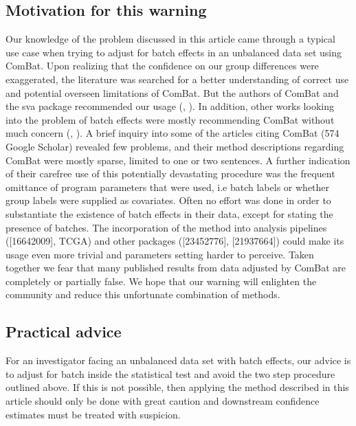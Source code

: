 \documentclass{bio}
\newcommand\CITE[1]{\textcolor{CITEcol}{[#1]}}
\begin{document}
\subsection{Motivation for this warning}

Our knowledge of the problem discussed in this article came through a typical use case when trying to adjust for batch effects in an unbalanced data set using ComBat. Upon realizing that the confidence on our group differences were exaggerated, the literature was searched for a better understanding of correct use and potential overseen limitations of ComBat. But the authors of ComBat and the sva package recommended our usage (\citealp{Johnson2007}, \citealp{Leek2012}). In addition, other works looking into the problem of batch effects were mostly recommending ComBat without much concern (\citealp{Kupfer2012}, \citealp{Kitchen2011}). A brief inquiry into  some of the articles citing ComBat (574 Google Scholar) revealed few problems, and their method descriptions regarding ComBat were mostly sparse, limited to one or two sentences. A further indication of their carefree use of this potentially devastating procedure was the frequent omittance of program parameters that were used, i.e batch labels or whether group labels were supplied as covariates. Often no effort was done in order to substantiate the existence of batch effects in their data, except for stating the presence of batches. The incorporation of the method into analysis pipelines (\CITE{16642009}, TCGA) and other packages (\CITE{23452776}, \CITE{21937664}) could make its usage even more trivial and parameters setting harder to perceive. Taken together we fear that many published results from data adjusted by ComBat are completely or partially false. We hope that our warning will enlighten the community and  reduce this unfortunate combination of methods.


\subsection{Practical advice}

For an investigator facing an unbalanced data set with batch effects, our advice is to adjust for batch inside the statistical test and avoid the two step procedure outlined above. If this is not possible, then applying the method described in this article should only be done with great caution and downstream confidence estimates must be treated with suspicion.
\end{document}
